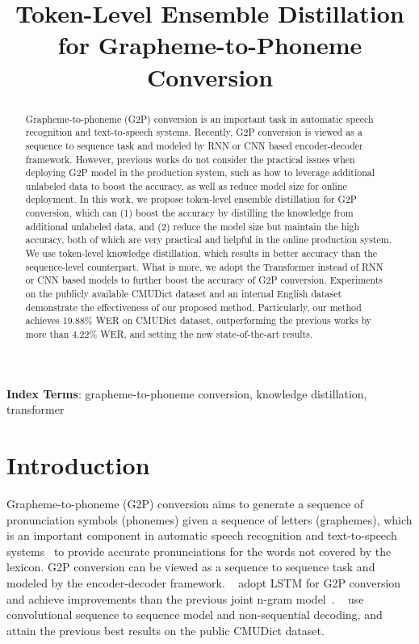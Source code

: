 \documentclass[a4paper]{article}
\title{Token-Level Ensemble Distillation for Grapheme-to-Phoneme Conversion}
\begin{document}
\maketitle
\begin{abstract}

Grapheme-to-phoneme (G2P) conversion is an important task in automatic speech recognition and text-to-speech systems. Recently, G2P conversion is viewed as a sequence to sequence task and modeled by RNN or CNN based encoder-decoder framework. However, previous works do not consider the practical issues when deploying G2P model in the production system, such as how to leverage additional unlabeled data to boost the accuracy, as well as reduce model size for online deployment. In this work, we propose token-level ensemble distillation for G2P conversion, which can (1) boost the accuracy by distilling the knowledge from additional unlabeled data, and (2) reduce the model size but maintain the high accuracy, both of which are very practical and helpful in the online production system. We use token-level knowledge distillation, which results in better accuracy than the sequence-level counterpart. What is more, we adopt the Transformer instead of RNN or CNN based models to further boost the accuracy of G2P conversion. Experiments on the publicly available CMUDict dataset and an internal English dataset demonstrate the effectiveness of our proposed method. Particularly, our method achieves 19.88\% WER on CMUDict dataset, outperforming the previous works by more than 4.22\% WER, and setting the new state-of-the-art results.

\end{abstract}
\noindent\textbf{Index Terms}: grapheme-to-phoneme conversion, knowledge distillation, transformer

\section{Introduction}


Grapheme-to-phoneme (G2P) conversion aims to generate a sequence of pronunciation symbols (phonemes) given a sequence of letters (graphemes), which is an important component in automatic speech recognition and text-to-speech systems~\cite{ren2019almost,ren2019fastspeech} to provide accurate pronunciations for the words not covered by the lexicon. G2P conversion can be viewed as a sequence to sequence task and modeled by the encoder-decoder framework. ~\cite{yao2015sequence} adopt LSTM for G2P conversion and achieve improvements than the previous joint n-gram model~\cite{bisani2008joint}. ~\cite{chae2018convolutional} use convolutional sequence to sequence model and non-sequential decoding, and attain the previous best results on the public CMUDict dataset.
\end{document}
